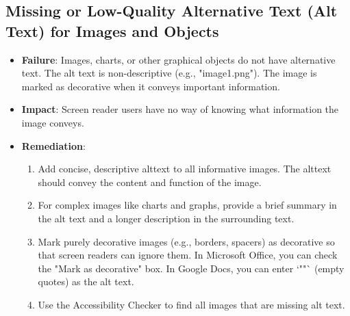 \subsection{Missing or Low-Quality Alternative Text (Alt Text) for Images and Objects}
\label{subsec:failures-alt-text}
\begin{itemize}
	\item \textbf{Failure}: Images, charts, or other graphical objects do not have alternative text. The alt text is non-descriptive (e.g., "image1.png"). The image is marked as decorative when it conveys important information.
	\item \textbf{Impact}: Screen reader users have no way of knowing what information the image conveys.
	\item \textbf{Remediation}:
	      \begin{enumerate}
		      \item Add concise, descriptive \gls{alttext} to all informative images. The \gls{alttext} should convey the content and function of the image.
		      \item For complex images like \gls{charts} and graphs, provide a brief summary in the alt text and a longer description in the surrounding text.
		      \item Mark purely decorative images (e.g., borders, spacers) as decorative so that screen readers can ignore them. In Microsoft Office, you can check the "Mark as decorative" box. In Google Docs, you can enter `""` (empty quotes) as the alt text.
		      \item Use the Accessibility Checker to find all images that are missing alt text.
	      \end{enumerate}
\end{itemize}

